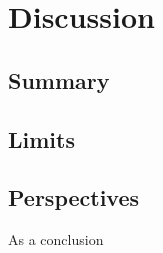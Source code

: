\section{Discussion}
\label{sec:discussion}
\CNS
\subsection{Summary}

\subsection{Limits}

\subsection{Perspectives}
\else

As a conclusion
\fi
